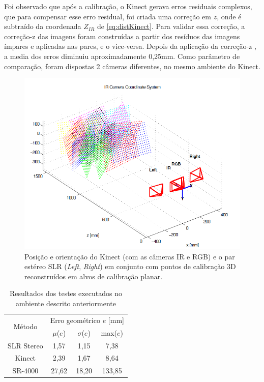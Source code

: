 Foi observado que após a calibração, o Kinect gerava erros residuais complexos, que para compensar esse erro residual, foi criada uma correção em $z$, onde é subtraído da coordenada $Z_{IR}$ de \ref{eq:distKinect}.
Para validar essa correção, a correção-z das imagens foram construídas a partir dos resíduos das imagens ímpares e aplicadas nas pares, e o vice-versa. Depois da aplicação da correção-z , a media dos erros diminuiu aproximadamente 0,25mm.
Como parâmetro de comparação, foram dispostas 2 câmeras diferentes, no mesmo ambiente do Kinect.


\begin{figure}[!h]
	\centering
	\includegraphics[width=1\linewidth]{figs/ambientekinect.png}
	\caption{%
	Posição e orientação do Kinect (com as câmeras IR e RGB) e o par estéreo SLR ({\it Left}, {\it Right}) em conjunto com pontos de calibração 3D reconstruídos em alvos de calibração planar.
	}\label{fig:ambienteKinect}
\end{figure}

\begin{table}[htbp]
\caption{Resultados dos testes executados no ambiente descrito anteriormente}
\label{tab:resultadosKinect}
\begin{center}
\begin{tabular}{|c|c|c|c|}
\hline
\multirow{2}{1.5cm}{Método}& \multicolumn{3}{p{5cm}|}{Erro geométrico $e$ [mm]} \bigstrut \\
\cline{2-4} & \multicolumn{1}{c|}{$\mu$($e$)} & \multicolumn{1}{c|}{$\sigma$($e$)} & \multicolumn{1}{c|}{max($e$)} \bigstrut \\ \hline
SLR Stereo & 1,57 & 1,15 & 7,38 \bigstrut \\ \hline
Kinect & 2,39 & 1,67 & 8,64 \bigstrut \\ \hline
SR-4000 & 27,62 & 18,20 & 133,85 \bigstrut \\ 
\hline
\end{tabular}
\end{center}
\end{table}



